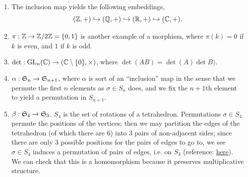 \begin{enumerate}[label=(\alph*)]
    \item The inclusion map yields the following embeddings,
    \[ (\mathbb Z, +) \hookrightarrow{} (\mathbb Q, +) \hookrightarrow{} (\mathbb R, +) \hookrightarrow{} (\mathbb C, +). \]
    \item $\pi : \mathbb Z \to \mathbb Z/2\mathbb Z = \{0, 1\}$ is another example of a morphism, where $\pi(k) = 0$ if $k$ is even, and $1$ if $k$ is odd. 
    \item $\det : \operatorname{GL}_n(\mathbb C) \to (\mathbb C \setminus \{0\}, \times)$, where $\det (AB) = \det (A) \det B)$. 
    \item $\alpha : \mathfrak S_n \to \mathfrak S_{n+1}$, where $\alpha$ is sort of an ``inclusion'' map in the sense that we permute the first $n$ elements as $\sigma \in S_n$ does, and we fix the $n+1$th element to yield a permutation in $S_{n+1}$.
    \item $\beta : \mathfrak S_4 \to \mathfrak S_3$. $S_4$ is the set of rotations of a tetrahedron. Permutations $\sigma \in S_4$ permute the positions of the vertices; then we may partition the edges of the tetrahedron (of which there are $6$) into $3$ pairs of non-adjacent sides; since there are only $3$ possible positions for the pairs of edges to go to, we see $\sigma \in S_4$ induces a permutation of pairs of edges, i.e. on $S_3$ (reference: \href{https://math.stackexchange.com/questions/3365927/homomorphism-from-s-4-to-s-3}{here}). We can check that this is a homomorphism because it preserves multiplicative structure.
\end{enumerate}

